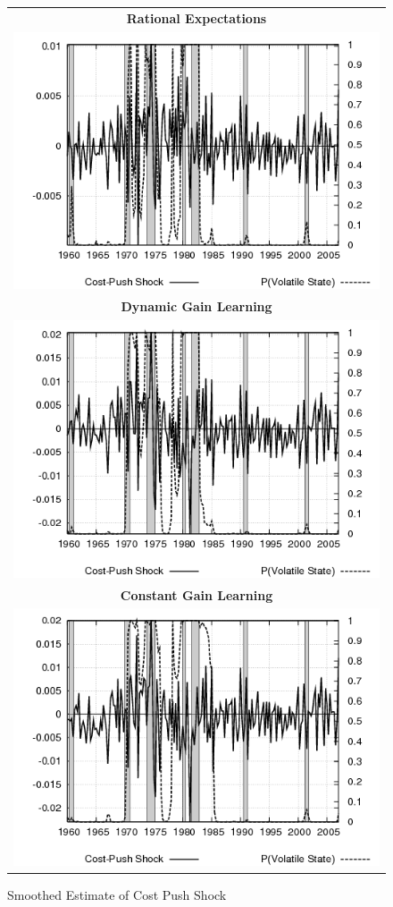 \begin{figure}[ht]
\caption{Smoothed Estimate of Cost Push Shock}\label{fg3:costpush}
\begin{center}
\begin{tabular}{c}
\textbf{Rational Expectations} \\  
\includegraphics[scale=0.5]{results_re/costpush.png} \\
\textbf{Dynamic Gain Learning} \\
\includegraphics[scale=0.5]{results_dg8_wlsinit/costpush.png} \\
\textbf{Constant Gain Learning} \\
\includegraphics[scale=0.5]{results_cg_wlsinit/costpush.png} 

\end{tabular}
\end{center}
\end{figure}
